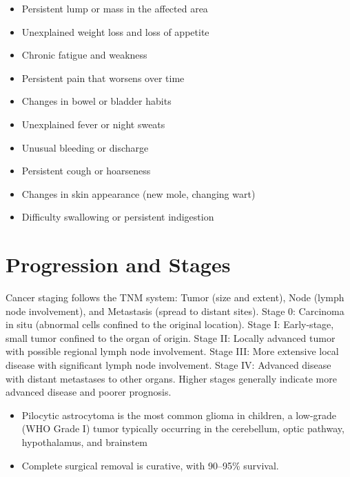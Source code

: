 \begin{itemize}[noitemsep]
  \item Persistent lump or mass in the affected area
  \item Unexplained weight loss and loss of appetite
  \item Chronic fatigue and weakness
  \item Persistent pain that worsens over time
  \item Changes in bowel or bladder habits
  \item Unexplained fever or night sweats
  \item Unusual bleeding or discharge
  \item Persistent cough or hoarseness
  \item Changes in skin appearance (new mole, changing wart)
  \item Difficulty swallowing or persistent indigestion
\end{itemize}
\section{Progression and Stages}
Cancer staging follows the TNM system: Tumor (size and extent), Node (lymph node involvement), and Metastasis (spread to distant sites). Stage 0: Carcinoma in situ (abnormal cells confined to the original location). Stage I: Early-stage, small tumor confined to the organ of origin. Stage II: Locally advanced tumor with possible regional lymph node involvement. Stage III: More extensive local disease with significant lymph node involvement. Stage IV: Advanced disease with distant metastases to other organs. Higher stages generally indicate more advanced disease and poorer prognosis.

\begin{itemize}[noitemsep]
  \item Pilocytic astrocytoma is the most common glioma in children, a low-grade (WHO Grade I) tumor typically occurring in the cerebellum, optic pathway, hypothalamus, and brainstem
  \item Complete surgical removal is curative, with 90--95\% survival.
\end{itemize}
